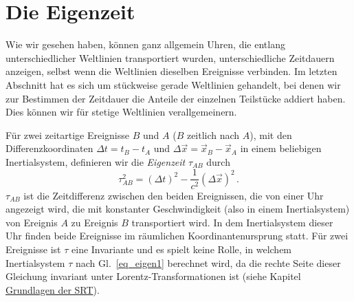 \section{Die Eigenzeit}

Wie wir gesehen haben, k\"onnen ganz allgemein
Uhren, die entlang unterschiedlicher Weltlinien
transportiert wurden, unterschiedliche Zeitdauern
anzeigen, selbst wenn die Weltlinien dieselben Ereignisse verbinden.
Im letzten Abschnitt hat es sich um st\"uckweise gerade
Weltlinien gehandelt, bei denen wir zur
Bestimmen der Zeitdauer die Anteile der
einzelnen Teilst\"ucke addiert haben. Dies
k\"onnen wir f\"ur stetige Weltlinien verallgemeinern.

F\"ur zwei zeitartige Ereignisse $B$ und $A$
($B$ zeitlich nach $A$),
mit den Differenzkoordinaten $\Delta t=t_B-t_A$
und $\Delta \vec{x}=\vec{x}_B - \vec{x}_A$ 
in einem beliebigen Inertialsystem,
definieren wir die {\em Eigenzeit} $\tau_{AB}$
durch
\begin{equation}
\label{eq_eigen1}
      \tau_{AB}^2 = (\Delta t)^2 - \frac{1}{c^2} (\Delta \vec{x})^2\, .
\end{equation}
$\tau_{AB}$ ist die Zeitdifferenz zwischen den beiden
Ereignissen, die von einer Uhr angezeigt
wird, die mit konstanter Geschwindigkeit (also in einem
Inertialsystem) von Ereignis $A$ zu Ereignis $B$
transportiert wird. In dem Inertialsystem dieser
Uhr finden beide Ereignisse im r\"aumlichen
Koordinantenursprung statt. F\"ur zwei Ereignisse
ist $\tau$ eine Invariante und es spielt keine
Rolle, in welchem Inertialsystem $\tau$ nach
Gl.\ \ref{eq_eigen1} berechnet wird, da die rechte Seite dieser Gleichung
invariant unter Lorentz-Transformationen ist (siehe Kapitel \hyperref[chap_Grundlagen]{Grundlagen der SRT}). 

